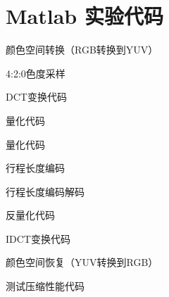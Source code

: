 \chapter{Matlab 实验代码}

颜色空间转换（RGB转换到YUV）


4:2:0色度采样


DCT变换代码


量化代码


量化代码


行程长度编码


行程长度编码解码


反量化代码


IDCT变换代码


颜色空间恢复（YUV转换到RGB）


测试压缩性能代码
